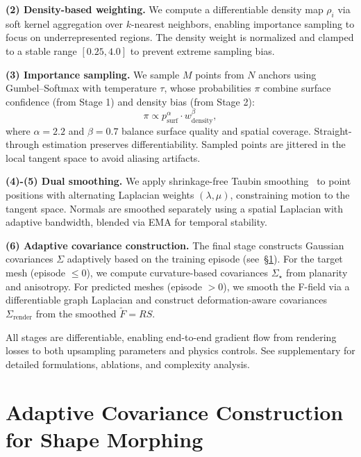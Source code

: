     \textbf{(2) Density-based weighting.} 
    We compute a differentiable density map $\rho_i$ via soft kernel aggregation over $k$-nearest neighbors, enabling importance sampling to focus on underrepresented regions. The density weight is normalized and clamped to a stable range $[0.25, 4.0]$ to prevent extreme sampling bias.
    
    \textbf{(3) Importance sampling.} 
    We sample $M$ points from $N$ anchors using Gumbel--Softmax with temperature $\tau$, whose probabilities $\pi$ combine surface confidence (from Stage 1) and density bias (from Stage 2):
    \begin{equation}
    \pi \propto p_{\text{surf}}^\alpha \cdot w_{\text{density}}^\beta,
    \end{equation}
    where $\alpha=2.2$ and $\beta=0.7$ balance surface quality and spatial coverage. Straight-through estimation preserves differentiability. Sampled points are jittered in the local tangent space to avoid aliasing artifacts.
    
    \textbf{(4)-(5) Dual smoothing.} 
    We apply shrinkage-free Taubin smoothing~\citep{taubin1995signal} to point positions with alternating Laplacian weights $(\lambda, \mu)$, constraining motion to the tangent space. Normals are smoothed separately using a spatial Laplacian with adaptive bandwidth, blended via EMA for temporal stability.
    
    \textbf{(6) Adaptive covariance construction.}
    The final stage constructs Gaussian covariances $\Sigma$ adaptively based on the training episode (see~\S\ref{sec:covariance}). For the target mesh (episode $\leq 0$), we compute curvature-based covariances $\Sigma_\star$ from planarity and anisotropy. For predicted meshes (episode $> 0$), we smooth the F-field via a differentiable graph Laplacian and construct deformation-aware covariances $\Sigma_{\text{render}}$ from the smoothed $\tilde{F}=RS$.
    
All stages are differentiable, enabling end-to-end gradient flow from rendering losses to both upsampling parameters and physics controls. See supplementary for detailed formulations, ablations, and complexity analysis.

\section{Adaptive Covariance Construction for Shape Morphing}
\label{sec:covariance}

